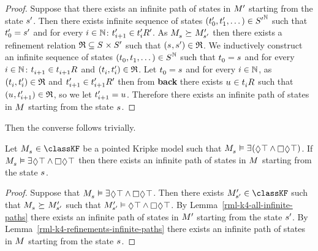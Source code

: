 \begin{proof}
Suppose that there exists an infinite path of states in ${M^{\prime}_{}}$ starting from the state ${s}^{\prime}$.
Then there exists infinite sequence of states $({t}^{\prime}_0, {t}^{\prime}_1, \dots) \in {S^{\prime}}^{\mathbb{N}}$ such that ${t}^{\prime}_0 = {s}^{\prime}$ and for every $i \in \mathbb{N}$: ${t}^{\prime}_{i + 1} \in {{t}^{\prime}_i} {R^{\prime}_{}}$.
As $\kPModel{\kStateS} \simulates \kPModelP{\kStateSP}$ then there exists a refinement relation $\refinement \subseteq \kStates \times \kStatesP$ such that $(\kStateS, \kStateSP) \in \refinement$.
We inductively construct an infinite sequence of states $(\kStateT_0, \kStateT_1, \dots) \in \kStates^\naturals$ such that $\kStateT_0 = \kStateS$ and for every $i \in \mathbb{N}$: $\kStateT_{i + 1} \in \kSuccessors{}{\kStateT_{i + 1}}$ and $(\kStateT_i, \kStateTP_i) \in \refinement$.
Let $\kStateT_0 = \kStateS$ and for every $i \in \mathbb{N}$, as $(\kStateT_i, \kStateTP_i) \in \refinement$ and ${t}^{\prime}_{i + 1} \in {{t}^{\prime}_{i + 1}} {R^{\prime}_{}}$ then from {\bf back} there exists $\kStateU \in \kSuccessors{}{\kStateT_i}$ such that $(\kStateU, \kStateTP_{i + 1}) \in \refinement$, so we let $\kStateTP_{i + 1} = \kStateU$.
Therefore there exists an infinite path of states in $\kModel$ starting from the state $\kStateS$.
\end{proof}

Then the converse follows trivially.

\begin{lemma}\label{rml-k4-pruning-converse}
Let $\kPModel{\kStateS} \in \classKF$ be a pointed Kripke model such that $\kPModel{\kStateS} \entails \somerefs (\possible \top \land \necessary \possible \top)$.
If $\kPModel{\kStateS} \entails \somerefs \possible \top \land \necessary \possible \top$ then there exists an infinite path of states in $\kModel$ starting from the state $\kStateS$.
\end{lemma}

\begin{proof}
Suppose that $\kPModel{\kStateS} \entails \somerefs \possible \top \land \necessary \possible \top$.
Then there exists $\kPModelP{\kStateSP} \in \classKF$ such that $\kPModel{\kStateS} \simulates \kPModelP{\kStateSP}$ such that $\kPModelP{\kStateSP} \entails \possible \top \land \necessary \possible \top$.
By Lemma~\ref{rml-k4-all-infinite-paths} there exists an infinite path of states in ${M^{\prime}_{}}$ starting from the state ${s}^{\prime}$.
By Lemma~\ref{rml-k4-refinements-infinite-paths} there exists an infinite path of states in $\kModel$ starting from the state $\kStateS$.
\end{proof}

